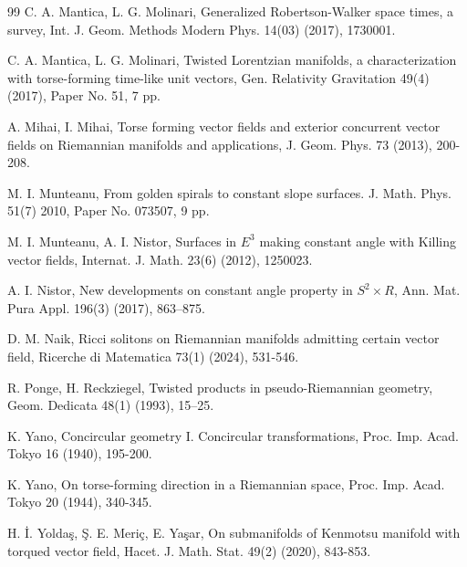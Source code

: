 \documentclass[12pt]{amsart}
\theoremstyle{definition}
\begin{document}
\begin{thebibliography}{99}
 C. A. Mantica, L. G. Molinari, Generalized Robertson-Walker space times, a survey, Int. J. Geom. Methods Modern Phys. 14(03) (2017), 1730001.

 C. A. Mantica, L. G. Molinari, Twisted Lorentzian manifolds, a characterization with torse-forming time-like unit vectors, Gen. Relativity Gravitation 49(4) (2017), Paper No. 51, 7 pp.

 A. Mihai, I. Mihai, Torse forming vector fields and exterior concurrent vector fields on Riemannian manifolds and applications, J. Geom. Phys. 73 (2013), 200-208.

 M. I. Munteanu, From golden spirals to constant slope surfaces. J. Math. Phys. 51(7) 2010, Paper No. 073507, 9 pp.

 M. I. Munteanu, A. I. Nistor, Surfaces in $E^3$ making constant angle with Killing vector fields, Internat. J. Math. 23(6) (2012), 1250023.

 A. I. Nistor, New developments on constant angle property in $S^2\times R$, Ann. Mat. Pura Appl. 196(3) (2017), 863–875.

 D. M. Naik, Ricci solitons on Riemannian manifolds admitting certain vector field, Ricerche di Matematica 73(1) (2024), 531-546.

 R. Ponge, H. Reckziegel, Twisted products in pseudo-Riemannian geometry, Geom. Dedicata 48(1) (1993), 15–25.

 K. Yano, Concircular geometry I. Concircular transformations, Proc. Imp. Acad. Tokyo 16 (1940), 195-200.

 K. Yano, On torse-forming direction in a Riemannian space, Proc. Imp. Acad. Tokyo 20 (1944), 340-345.

 H. İ. Yoldaş, Ş. E. Meriç, E. Yaşar, On submanifolds of Kenmotsu manifold with torqued vector field, Hacet. J. Math. Stat. 49(2) (2020), 843-853.

\end{thebibliography}




 
\end{document}
